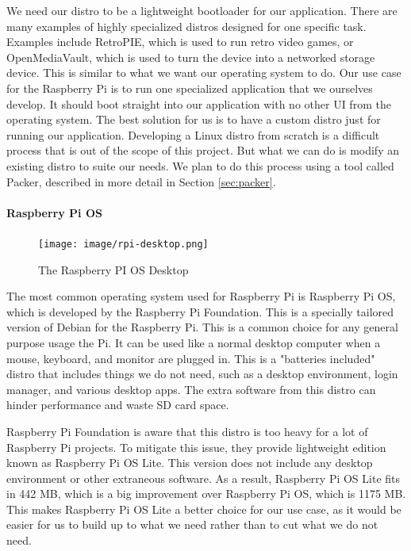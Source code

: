 We need our distro to be a lightweight bootloader for our application. There are many
examples of highly specialized distros designed for one specific task. Examples
include RetroPIE, which is used to run retro video games, or OpenMediaVault, which is used
to turn the device into a networked storage device. This is similar to what we want our
operating system to do. Our use case for the Raspberry Pi is to run one specialized
application that we ourselves develop. It should boot straight into our application with
no other UI from the operating system. The best solution for us is to have a custom distro
just for running our application. Developing a Linux distro from scratch is a difficult
process that is out of the scope of this project. But what we can do is modify an existing
distro to suite our needs. We plan to do this process using a tool called Packer,
described in more detail in Section \ref{sec:packer}.

\paragraph{Raspberry Pi OS}

\begin{figure}[h!]
  \centering
  \texttt{[image: image/rpi-desktop.png]}
  \caption{The Raspberry PI OS Desktop \autocite{rpi-desktop}}
  \label{fig:rpios}
\end{figure}

The most common operating system used for Raspberry Pi is Raspberry Pi OS, which is
developed by the Raspberry Pi Foundation. This is a specially tailored version of Debian
for the Raspberry Pi. This is a common choice for any general purpose usage the Pi. It can
be used like a normal desktop computer when a mouse, keyboard, and monitor are plugged in.
This is a "batteries included" distro that includes things we do not need, such as a
desktop environment, login manager, and various desktop apps. The extra software from this
distro can hinder performance and waste SD card space.

Raspberry Pi Foundation is aware that this distro is too heavy for a lot of Raspberry Pi
projects. To mitigate this issue, they provide lightweight edition known as Raspberry Pi
OS Lite. This version does not include any desktop environment or other extraneous
software. As a result, Raspberry Pi OS Lite fits in 442 MB, which is a big improvement
over Raspberry Pi OS, which is 1175 MB. This makes Raspberry Pi OS Lite a better choice
for our use case, as it would be easier for us to build up to what we need rather than to
cut what we do not need.

